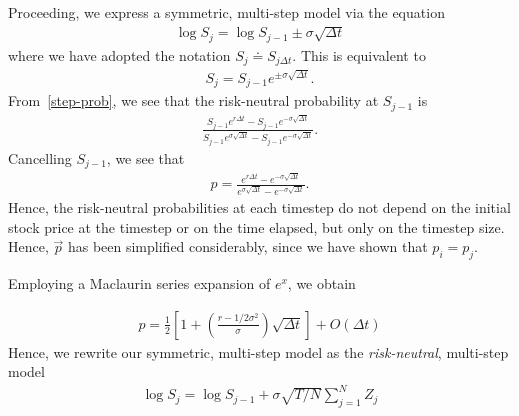 \documentclass[12pt]{article}
\theoremstyle{plain}
\theoremstyle{definition}
\theoremstyle{remark}
\numberwithin{equation}{section}  %
\begin{document}
Proceeding, we express a symmetric, multi-step model via the equation
\begin{equation*}
\begin{split}
	\log S_{j} = \log S_{j - 1} \pm \sigma \sqrt{\Delta t}
\end{split}
\end{equation*}
where we have adopted the notation $S_{j} \doteq S_{j \Delta t}$.
This is equivalent to 
\begin{equation*}
\begin{split}
	S_{j} = S_{j -1} e^{\pm \sigma \sqrt{\Delta t}}.
\end{split}
\end{equation*}
From~\eqref{step-prob}, we see that the risk-neutral probability
at $S_{j-1}$ is
\begin{equation*}
\begin{split}
	\frac{S_{j-1}e^{r \Delta t} - S_{j-1} e^{-\sigma \sqrt{\Delta
	t}}}{S_{j-1}e^{\sigma \sqrt{\Delta t}} - S_{j-1}e^{-\sigma \sqrt{\Delta t}}}.
\end{split}
\end{equation*}
Cancelling $S_{j-1}$, we see that 
\begin{equation*}
\begin{split}
	p  = \frac{e^{r \Delta t} -  e^{-\sigma \sqrt{\Delta t}}}{e^{\sigma
		\sqrt{\Delta t}} - e^{-\sigma \sqrt{\Delta t}}}.
\end{split}
\end{equation*}
Hence, the risk-neutral probabilities at each timestep do not depend
on the initial stock price at the timestep or on the time elapsed,
but only on the timestep size. Hence, $\vec{p}$ has been simplified
considerably, since we have shown that $p_{i} = p_{j}$. 

Employing a Maclaurin series expansion of $e^{x}$, we obtain

\begin{equation*}
\begin{split}
	p = \frac{1}{2} \left[ 1 + \left( \frac{r - 1/2 \sigma^{2}}{\sigma}
	\right)\sqrt{\Delta t} \right]  + O(\Delta t)
\end{split}
\end{equation*}
Hence, we rewrite our symmetric, multi-step model as the
\emph{risk-neutral}, multi-step model
\begin{equation*}
\begin{split}
	\log S_{j} = \log S_{j-1} + \sigma \sqrt{T/N} \sum_{j=1}^{N} Z_{j}
\end{split}
\end{equation*}
\end{document}
